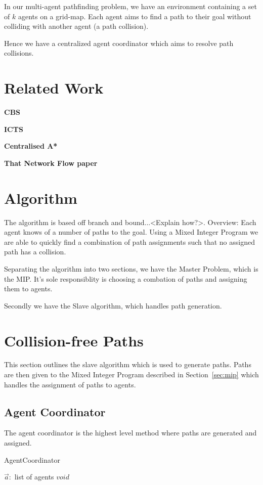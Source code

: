 \documentclass[a4paper,11pt]{article}
\begin{document}
In our multi-agent pathfinding problem, we have an environment containing a set of $k$ agents on a grid-map. Each agent aims to find a path to their goal without colliding with another agent (a path collision).

Hence we have a centralized agent coordinator which aims to resolve path collisions.

\section{Related Work}
\textbf{CBS}

\textbf{ICTS}

\textbf{Centralised A*}

\textbf{That Network Flow paper}

\section{Algorithm}
The algorithm is based off branch and bound...<Explain how?>. Overview: Each agent knows of a number of paths to the goal. Using a Mixed Integer Program we are able to quickly find a combination of path assignments such that no assigned path has a collision. 

Separating the algorithm into two sections, we have the Master Problem, which is the MIP. It's sole responsiblity is choosing a combation of paths and assigning them to agents.

Secondly we have the Slave algorithm, which handles path generation.

\section{Collision-free Paths}
This section outlines the slave algorithm which is used to generate paths. Paths are then given to the Mixed Integer Program described in Section~\ref{sec:mip} which handles the assignment of paths to agents.

\subsection{Agent Coordinator}

The agent coordinator is the highest level method where paths are generated and assigned. 

\begin{algorithm}
	\caption{AgentCoordinator}\label{alg_AgentCoordinator}
	\begin{algorithmic}[1]
		\Require $\vec{a}:$ list of agents
		\Ensure $void$
		\Do
	\end{algorithmic}
\end{algorithm}
\end{document}
